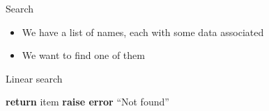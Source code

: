 \newcommand{\namessorted}{
	\fbox{\parbox{0.9\textwidth}{\tiny
		Anderson, Martha \par
		Baker, Theresa \par
		Brown, Janet \par
		Clark, Stephanie \par
		Collins, Jane \par
		Cox, Shirley \par
		Davis, Marilyn \par
		Diaz, Harold \par
		Gonzalez, Adam \par
		Henderson, Lawrence \par
		Hughes, Aaron \par
		Kelly, Philip \par
		Lewis, Rose \par
		Lopez, Jeffrey \par
		Miller, Jeremy \par
		Parker, Debra \par
		Perez, Diana \par
		Russell, Mildred \par
		Sanders, Phillip \par
		Scott, Michelle \par
		Stewart, Howard \par
		Ward, Jessica \par
		White, Amanda \par
		Williams, Billy \par
		Young, Frank
	}}
}

\begin{frame}{Search}
			\begin{itemize}
				\item We have a list of names, each with some data associated \pause
				\item We want to find one of them
			\end{itemize}
\end{frame}

\begin{frame}{Linear search}
			\begin{algorithmic}
				 \pause
					 \pause
						 \pause
							\State \textbf{return} item \pause
						\EndIf
					\EndFor
					\State \textbf{raise error} ``Not found'' \pause
				\EndProcedure
			\end{algorithmic}
\end{frame}

